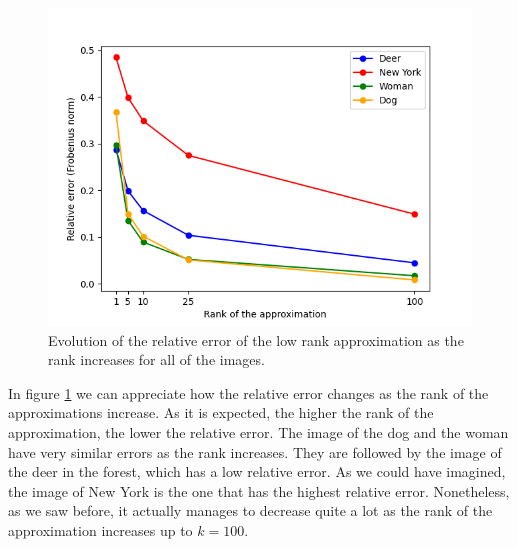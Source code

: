\documentclass[11pt,a4paper]{article}
\begin{document}
\begin{figure}[H]
  \centering
  \includegraphics[scale=0.55]{img/lr_error}
  \caption{Evolution of the relative error of the low rank approximation as the rank increases for all of
  the images.}
  \label{fig:lr-error}
\end{figure}

In figure \ref{fig:lr-error} we can appreciate how the relative error changes as the rank of the approximations
increase. As it is expected, the higher the rank of the approximation, the lower the relative error. The image
of the dog and the woman have very similar errors as the rank increases. They are followed by the image of the
deer in the forest, which has a low relative error. As we could have imagined, the image of New York is the one
that has the highest relative error. Nonetheless, as we saw before, it actually manages to decrease quite a lot
as the rank of the approximation increases up to $k = 100$.
\end{document}
